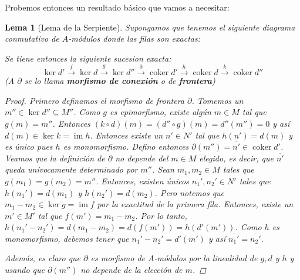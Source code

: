 \documentclass[12pt]{book}
\newtheorem{lem}[teo]{Lema}
\theoremstyle{definition}
\DeclareMathOperator{\im}{im}
\DeclareMathOperator{\coker}{coker}
\begin{document}
Probemos entonces un resultado básico que vamos a necesitar:
\newpage
\begin{lem}[Lema de la Serpiente]
Supongamos que tenemos el siguiente diagrama conmutativo de $A$-módulos donde las filas son exactas:
\begin{center}\end{center}
Se tiene entonces la siguiente sucesion exacta: $$ \ker d'\stackrel{f}{\longrightarrow} \ker d \stackrel{g}{\longrightarrow} \ker d'' \stackrel{\partial}{\longrightarrow} \coker d' \stackrel{h}{\longrightarrow} \coker d \stackrel{k}{\longrightarrow} \coker d''$$
(A $\partial$ se lo llama \textbf{morfismo de conexión} o de \textbf{frontera})

\begin{proof}

Primero definamos el morfismo de frontera $\partial$. Tomemos un $m''\in \ker d''\subseteq M''$. Como $g$ es epimorfismo, existe algún $m\in M$ tal que $g(m)=m''$. Entonces $(k\circ d)(m) = (d''\circ g)(m) = d''(m'')=0$ y así $d(m)\in \ker k=\im h$. Entonces existe un $n'\in N'$ tal que $h(n')=d(m)$ y es único pues $h$ es monomorfismo. Defino entonces $\partial(m'') = \overline{n'}\in\coker d'$. Veamos que la definición de $\partial$ no depende del $m\in M$ elegido, es decir, que $\overline{n'}$ queda unívocamente determinado por $m''$. Sean $m_1,m_2\in M$ tales que $g(m_1)=g(m_2)=m''$. Entonces, existen únicos $n_1', n_2'\in N'$ tales que $h(n_1') = d(m_1)$ y $h(n_2') = d(m_2)$. Pero notemos que $m_1-m_2\in \ker g = \im f$ por la exactitud de la primera fila. Entonces, existe un $m'\in M'$ tal que $f(m')=m_1-m_2$. Por lo tanto, $h(n_1' - n_2') = d(m_1-m_2) = d(f(m')) = h(d'(m'))$. Como $h$ es monomorfismo, debemos tener que $n_1' - n_2' = d'(m')$ y así $\overline{n_1'}=\overline{n_2'}$.

Además, es claro que $\partial$ es morfismo de $A$-módulos por la linealidad de $g,d$ y $h$ y usando que $\partial(m'')$ no depende de la elección de $m$.


\end{proof}
\end{lem}
\end{document}
